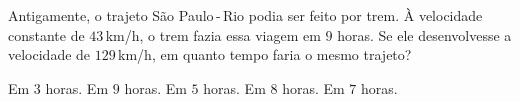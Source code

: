 Antigamente, o trajeto São Paulo\,-\,Rio podia ser feito por trem. À velocidade constante de $43$\,km/h, o trem fazia essa viagem em $9$ horas. Se ele desenvolvesse a velocidade de $129$\,km/h, em quanto tempo faria o mesmo trajeto?

Em $3$ horas.
Em $9$ horas.
Em $5$ horas.
Em $8$ horas.
Em $7$ horas.



